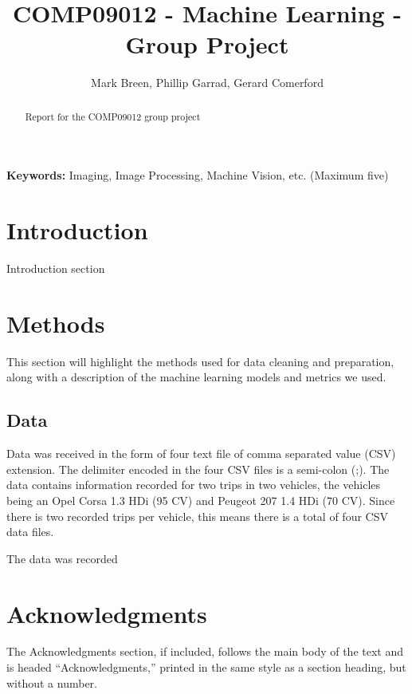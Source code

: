 \documentclass[a4paper,11pt]{article}
\begin{document}
\title{COMP09012 - Machine Learning - Group Project}

\author{Mark Breen, Phillip Garrad, Gerard Comerford}
\date{}
\maketitle
\thispagestyle{empty}



\begin{abstract}
Report for the COMP09012 group project
\end{abstract}
\textbf{Keywords:} Imaging, Image Processing, Machine Vision, etc. (Maximum five)



\section{Introduction}

Introduction section


\section{Methods}

This section will highlight the methods used for data cleaning and preparation, along with a description of the machine learning models and metrics we used.

\subsection{Data}

Data was received in the form of four text file of comma separated value (CSV) extension. The delimiter encoded in the four CSV files is a semi-colon (;). The data contains information recorded for two trips in two vehicles, the vehicles being an Opel Corsa 1.3 HDi (95 CV) and Peugeot 207 1.4 HDi (70 CV). Since there is two recorded trips per vehicle, this means there is a total of four CSV data files.

The data was recorded




\section*{Acknowledgments}

The Acknowledgments section, if included,
		       follows the main body of the text and is headed
		       ``Acknowledgments,'' printed in the same style
		       as a section heading, but without a number.
\end{document}
